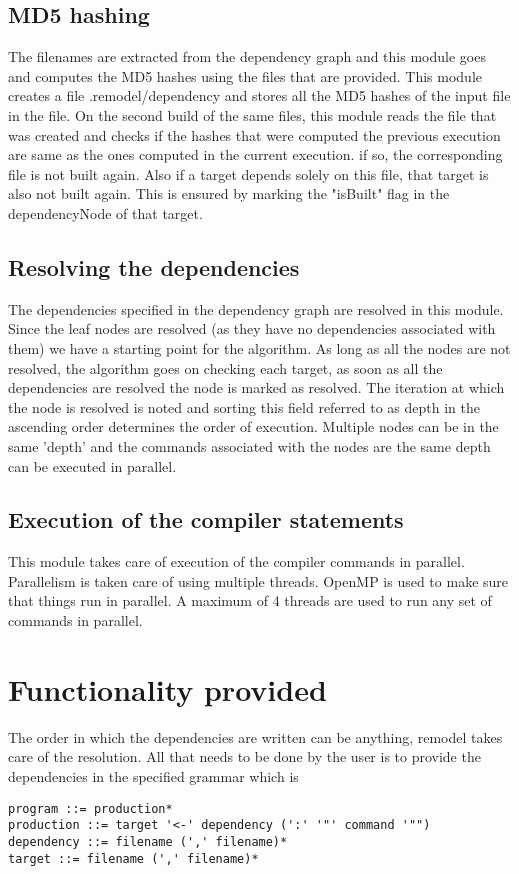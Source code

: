\documentclass[a4paper, 12pt, notitlepage]{report}
\begin{document}
\subsection{MD5 hashing}
The filenames are extracted from the dependency graph and this module goes and computes the MD5 hashes using the files that are provided. This module creates a file .remodel/dependency and stores all the MD5 hashes of the input file in the file. On the second build of the same files, this module reads the file that was created and checks if the hashes that were computed the previous execution are same as the ones computed in the current execution. if so, the corresponding file is not built again. Also if a target depends solely on this file, that target is also not built again. This is ensured by marking the "isBuilt" flag in the dependencyNode of that target.

\subsection{Resolving the dependencies}
The dependencies specified in the dependency graph are resolved in this module. Since the leaf nodes are resolved (as they have no dependencies associated with them) we have a starting point for the algorithm. As long as all the nodes are not resolved, the algorithm goes on checking each target, as soon as all the dependencies are resolved the node is marked as resolved. The iteration at which the node is resolved is noted and sorting this field referred to as depth in the ascending order determines the order of execution. Multiple nodes can be in the same 'depth' and the commands associated with the nodes are the same depth can be executed in parallel.

\subsection{Execution of the compiler statements}
This module takes care of execution of the compiler commands in parallel. Parallelism is taken care of using multiple threads. OpenMP is used to make sure that things run in parallel. A maximum of 4 threads are used to run any set of commands in parallel.

\section{Functionality provided}
The order in which the dependencies are written can be anything, remodel takes care of the resolution. All that needs to be done by the user is to provide the dependencies in the specified grammar which is
\begin{verbatim}
program ::= production*
production ::= target '<-' dependency (':' '"' command '"")
dependency ::= filename (',' filename)*
target ::= filename (',' filename)*
\end{verbatim}
\end{document}

